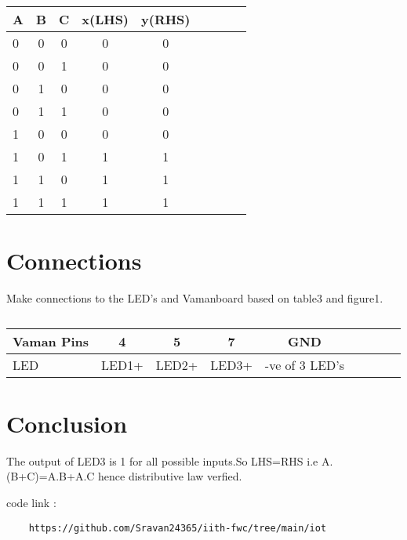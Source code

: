 \documentclass[10pt, a4paper]{article}
\begin{document}
\begin{table}[htbp]
 \begin{center}
    \begin{tabular}{|l|c|c|c|c|c|c|c|c} \hline \textbf{A}
  & \textbf{B} & \textbf{C} & \textbf{x(LHS)}& \textbf{y(RHS)} \\
 \hline
0&0&0&0&0 \\ \hline
0&0&1&0&0 \\ \hline
0&1&0&0&0\\ \hline
0&1&1&0&0  \\ \hline
1&0&0&0&0 \\ \hline
1&0&1&1&1\\ \hline
1&1&0&1&1\\ \hline
1&1&1&1&1\\ \hline
\end{tabular}   
\end{center}
\caption{\label{table:dummytable} }
\end{table}







\section{Connections}

Make connections to the LED's and Vamanboard based on table3 and figure1.
\begin{table}[htbp]
 \begin{center}
    \begin{tabular}{|l|c|c|c|c|c|c|c|c} \hline \textbf{Vaman Pins}
  & \textbf{4} & \textbf{5} & \textbf{7}& \textbf{GND}\\
 \hline
LED&LED1+&LED2+&LED3+&-ve of 3 LED's\\ \hline

\end{tabular}   
\end{center}
\caption{\label{table:dummytable} }
\end{table}




\section{Conclusion}
The output of LED3  is 1 for all possible inputs.So LHS=RHS i.e  A.(B+C)=A.B+A.C hence distributive law verfied.

code link :
 \begin{lstlisting}
    https://github.com/Sravan24365/iith-fwc/tree/main/iot
\end{lstlisting}
\end{document}
